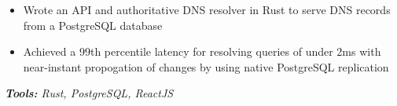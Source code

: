 \documentclass[10pt,letter]{altacv}
\begin{document}

\begin{itemize}
  \item Wrote an API and authoritative DNS resolver in Rust to serve DNS records \\ from a PostgreSQL database
  \item Achieved a 99th percentile latency for resolving queries of under 2ms with \\ near-instant propogation of changes by using native PostgreSQL replication
\end{itemize}
\textit{\textbf{Tools:} Rust, PostgreSQL, ReactJS}




\clearpage
\end{document}
